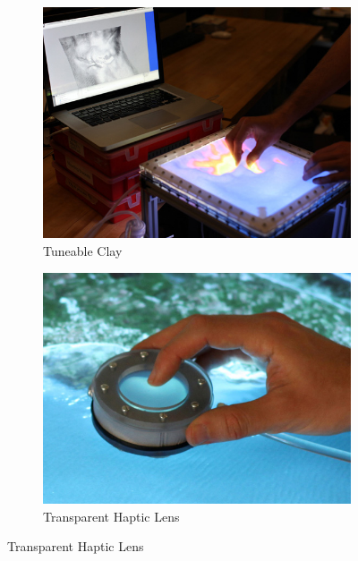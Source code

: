 \begin{figure}
        \centering
        \begin{subfigure}[b]{0.45\textwidth}
                \centering
                \includegraphics[width=\textwidth]{figures/jamming/jui_tunable-clay}
                \caption{Tuneable Clay}
                \label{fig:ch:jamming:jui-clay}
        \end{subfigure}
        \begin{subfigure}[b]{0.45\textwidth}
                \centering
                \includegraphics[width=\textwidth]{figures/jamming/jui_haptic-lens}
                \caption{Transparent Haptic Lens}
                \label{fig:ch:jamming:jui-lens}
        \end{subfigure}


\end{figure}
